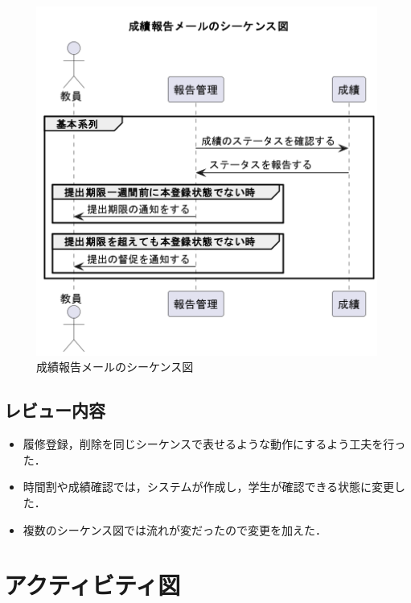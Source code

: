 \documentclass[documentclass]{jsarticle}
\begin{document}
\begin{figure}[H]
  \begin{center}
    \includegraphics*[scale=0.5]{figure/6-6.png}
  \end{center}
  \caption{成績報告メールのシーケンス図}
  \label{fig:6-6}
\end{figure}

\subsection*{レビュー内容}
\begin{itemize}
  \item 履修登録，削除を同じシーケンスで表せるような動作にするよう工夫を行った．
  \item 時間割や成績確認では，システムが作成し，学生が確認できる状態に変更した．
  \item 複数のシーケンス図では流れが変だったので変更を加えた．
\end{itemize}

\newpage

\section{アクティビティ図}
\end{document}

